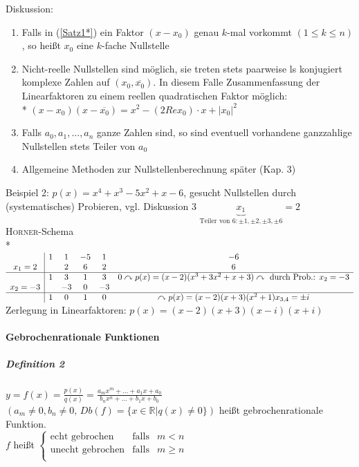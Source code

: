 \documentclass[a4paper]{scrartcl}
\begin{document}
Diskussion: 
\begin{enumerate}
\item Falls in (\ref{Satz1*}) ein Faktor $(x-x_0)$ genau $k$-mal vorkommt $(1 \leq k \leq n)$, so heißt $x_0$ eine $k$-fache Nullstelle
\item Nicht-reelle Nullstellen sind möglich, sie treten stets paarweise ls konjugiert komplexe Zahlen auf $(x_0,\overline{x_0})$. In diesem Falle Zusammenfassung der Linearfaktoren zu einem reellen quadratischen Faktor möglich:\\*
$(x-x_0)(x-\overline{x_0} ) = x^2 - (2 Re x_0 ) \cdot x + \lvert x_0 \rvert^2$
\item Falls $a_0,a_1,\dots , a_n$ ganze Zahlen sind, so sind eventuell vorhandene ganzzahlige Nullstellen stets Teiler von $a_0$
\item Allgemeine Methoden zur Nullstellenberechnung später (Kap. 3)
\end{enumerate}

Beispiel 2: $p(x)=x^4 + x^3 - 5x^2 + x -6$, gesucht Nullstellen durch (systematisches) Probieren, vgl. Diskussion 3 $\underbrace{x_1}_{\text{Teiler von } 6: \pm 1,\pm 2,\pm 3,\pm6}=2$\\
\textsc{Horner}-Schema\\*
$\begin{array}{c|ccccc}
&1&1&-5&1&-6\\
x_1=2&&2&6&2&6\\ \hline
&1&3&1&3&0 \curvearrowright p(x)=(x-2)(x^3 + 3x^2+x+3)\curvearrowright \text{ durch Prob.: } x_2 = -3\\
x_2=-3&&-3&0&-3&\\ \hline
&1&0&1&0& \curvearrowright p(x) = (x-2)(x+3)(x^2+1) x_{3,4}=\pm i\\

\end{array}$\\
Zerlegung in Linearfaktoren: $p(x)=(x-2)(x+3)(x-i)(x+i)$

\paragraph{Gebrochenrationale Funktionen}
\subparagraph{Definition 2} $y=f(x)=\frac{p(x)}{q(x)}=\frac{a_m x^m + \dots + a_1x + a_0}{b_n x^n + \dots + b_1 x +b_0}$\\
$(a_m\neq 0 , b_n \neq 0 , \, Db(f) = \{ x \in \mathbb{R} | q(x) \neq 0\} )$ heißt gebrochenrationale Funktion.\\
$f$ heißt $\left\{ \begin{array}{rcl}
         \text{echt gebrochen}
         & \mbox{falls}
         & m < n \\ 
        \text{unecht gebrochen}
         & \mbox{falls} 
         & m \geq n \\
                \end{array}\right.$
\end{document}
